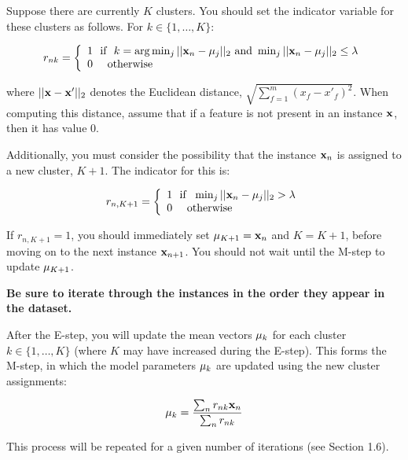 \documentclass[11pt]{article}
\newcommand{\vx}{{\bf x}}
\newcommand{\vxn}{{\bf x}_n}
\newcommand{\vmu}{{\bf \mu}}
\newcommand{\vmuk}{{\bf \mu}_k}
\newcommand{\vmuj}{{\bf \mu}_j}
\begin{document}
Suppose there are currently $K$ clusters. You should set the indicator variable for these clusters as follows. For $k \in \{1,\ldots,K\}$:

\begin{equation}
\label{eq:E1}
r_{nk} =  \left\{
     \begin{array}{lr}
        1~~  \textrm{if} ~~  k = \arg\min_j ||\vxn - \vmuj||_2  \textrm{ and }  \min_j ||\vxn - \vmuj||_2 \leq \lambda \\
        0 ~~   ~~ \textrm{otherwise}
     \end{array}
   \right.
\end{equation}

\noindent where $||\vx-\vx'||_2$ denotes the Euclidean distance, $\sqrt {\sum_{f=1}^m (x_f - x'_f)^2}$. When computing this distance, assume that if a feature is not present in an instance $\vx$, then it has value 0.

Additionally, you must consider the possibility that the instance $\vxn$ is assigned to a new cluster, $K+1$. The indicator for this is:

\begin{equation}
\label{eq:E2}
r_{n,K+1} =  \left\{
     \begin{array}{lr}
        1 ~~  \textrm{if} ~~  \min_j ||\vxn - \vmuj||_2 > \lambda \\
        0 ~~    ~~ \textrm{otherwise}
     \end{array}
   \right.
\end{equation}

\noindent If $r_{n,K+1}=1$, you should immediately set $\vmu_{K+1}=\vxn$ and $K=K+1$, before moving on to the next instance $\vx_{n+1}$. You should not wait until the M-step to update $\vmu_{K+1}$.

{\bf Be sure to  iterate through the instances in the order they appear in the dataset.}

After the E-step, you will update the mean vectors $\vmuk$ for each cluster $k \in \{1,\ldots,K\}$ (where $K$ may have increased during the E-step). This forms the M-step, in which the model parameters $\vmuk$ are updated using the new cluster assignments:

\begin{equation}
\vmu_{k}= \frac{\sum_n r_{nk} \vxn}{\sum_n r_{nk}}
\end{equation}

\noindent This process will be repeated for a given number of iterations (see Section 1.6).
\end{document}
